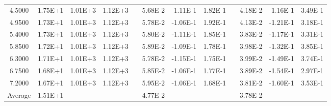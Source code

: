 \begin{center}
\begin{table}[h]
\begin{tabular}{cccccccccccc}
    4.5000 &   1.75E+1 &   1.01E+3 &   1.12E+3 &  &   5.68E-2 &  -1.11E-1 &   1.82E-1 &  &   4.18E-2 &  -1.16E-1 &   3.49E-1 \\
    4.9500 &   1.73E+1 &   1.01E+3 &   1.12E+3 &  &   5.78E-2 &  -1.06E-1 &   1.92E-1 &  &   4.13E-2 &  -1.21E-1 &   3.18E-1 \\
    5.4000 &   1.73E+1 &   1.01E+3 &   1.12E+3 &  &   5.80E-2 &  -1.11E-1 &   1.85E-1 &  &   3.83E-2 &  -1.17E-1 &   3.31E-1 \\
    5.8500 &   1.72E+1 &   1.01E+3 &   1.12E+3 &  &   5.89E-2 &  -1.09E-1 &   1.78E-1 &  &   3.98E-2 &  -1.32E-1 &   3.85E-1 \\
    6.3000 &   1.71E+1 &   1.01E+3 &   1.12E+3 &  &   5.78E-2 &  -1.15E-1 &   1.75E-1 &  &   3.99E-2 &  -1.49E-1 &   3.74E-1 \\
    6.7500 &   1.68E+1 &   1.01E+3 &   1.12E+3 &  &   5.85E-2 &  -1.06E-1 &   1.77E-1 &  &   3.89E-2 &  -1.54E-1 &   2.97E-1 \\
    7.2000 &   1.67E+1 &   1.01E+3 &   1.12E+3 &  &   5.95E-2 &  -1.06E-1 &   1.68E-1 &  &   3.81E-2 &  -1.60E-1 &   3.53E-1 \\
 \hline
Average &  1.51E+1& & & &  4.77E-2& & & &  3.78E-2\\
  \hline
 \end{tabular}
 \label{tab:ANH-hydro-error}
 \end{table}
\end{center}
\cp
